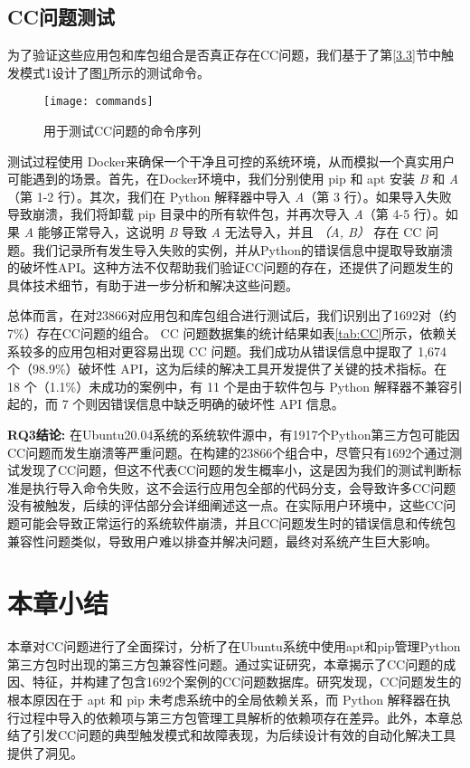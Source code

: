 \subsection{CC问题测试}
为了验证这些应用包和库包组合是否真正存在CC问题，我们基于了第\ref{3.3}节中触发模式1设计了图\ref{fig:command}所示的测试命令。
\begin{figure}[t] %
	\centering
	\texttt{[image: commands]}
	\caption{用于测试CC问题的命令序列}
	\label{fig:command}
\end{figure}

测试过程使用 Docker来确保一个干净且可控的系统环境，从而模拟一个真实用户可能遇到的场景。首先，在Docker环境中，我们分别使用 pip 和 apt 安装 \textit{B} 和 \textit{A}（第 1-2 行）。其次，我们在 Python 解释器中导入 \textit{A}（第 3 行）。如果导入失败导致崩溃，我们将卸载 pip 目录中的所有软件包，并再次导入 \textit{A}（第 4-5 行）。如果 \textit{A} 能够正常导入，这说明 \textit{B} 导致 \textit{A} 无法导入，并且 \textit{（A, B）} 存在 CC 问题。我们记录所有发生导入失败的实例，并从Python的错误信息中提取导致崩溃的破坏性API。这种方法不仅帮助我们验证CC问题的存在，还提供了问题发生的具体技术细节，有助于进一步分析和解决这些问题。



总体而言，在对23866对应用包和库包组合进行测试后，我们识别出了1692对（约7\%）存在CC问题的组合。
CC 问题数据集的统计结果如表\ref{tab:CC}所示，依赖关系较多的应用包相对更容易出现 CC 问题。我们成功从错误信息中提取了 1,674 个（98.9\%）破坏性 API，这为后续的解决工具开发提供了关键的技术指标。在 18 个（1.1\%）未成功的案例中，有 11 个是由于软件包与 Python 解释器不兼容引起的，而 7 个则因错误信息中缺乏明确的破坏性 API 信息。

\begin{tcolorbox}[boxrule=1pt,boxsep=1pt,left=2pt,right=2pt,top=2pt,bottom=2pt]
	\small
	\textcolor{red}{} \noindent\textbf{RQ3结论:} 
	在Ubuntu20.04系统的系统软件源中，有1917个Python第三方包可能因CC问题而发生崩溃等严重问题。在构建的23866个组合中，尽管只有1692个通过测试发现了CC问题，但这不代表CC问题的发生概率小，这是因为我们的测试判断标准是执行导入命令失败，这不会运行应用包全部的代码分支，会导致许多CC问题没有被触发，后续的评估部分会详细阐述这一点。在实际用户环境中，这些CC问题可能会导致正常运行的系统软件崩溃，并且CC问题发生时的错误信息和传统包兼容性问题类似，导致用户难以排查并解决问题，最终对系统产生巨大影响。
\end{tcolorbox} 

\section{本章小结}
本章对CC问题进行了全面探讨，分析了在Ubuntu系统中使用apt和pip管理Python第三方包时出现的第三方包兼容性问题。通过实证研究，本章揭示了CC问题的成因、特征，并构建了包含1692个案例的CC问题数据库。研究发现，CC问题发生的根本原因在于 apt 和 pip 未考虑系统中的全局依赖关系，而 Python 解释器在执行过程中导入的依赖项与第三方包管理工具解析的依赖项存在差异。此外，本章总结了引发CC问题的典型触发模式和故障表现，为后续设计有效的自动化解决工具提供了洞见。